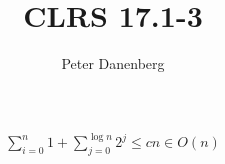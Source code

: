 \documentclass{article}
\author{Peter Danenberg}
\title{CLRS 17.1-3}
\begin{document}
\maketitle

\begin{align}
  \sum_{i=0}^n 1 + \sum_{j=0}^{\log n} 2^j \leq cn \in O(n)
\end{align}
\end{document}
